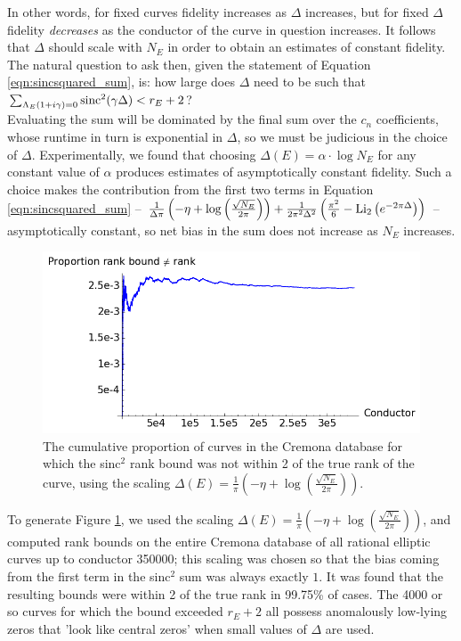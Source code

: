 In other words, for fixed curves fidelity increases as $\Delta$ increases, but for fixed $\Delta$ fidelity {\it decreases} as the conductor of the curve in question increases. It follows that $\Delta$ should scale with $N_E$ in order to obtain an estimates of constant fidelity. The natural question to ask then, given the statement of Equation \ref{eqn:sincsquared_sum}, is: how large does $\Delta$ need to be such that $\sum_{\Lambda_E(1+i\gamma)=0}\operatorname{sinc}^2(\gamma \Delta) < r_E+2$? \\

Evaluating the sum will be dominated by the final sum over the $c_n$ coefficients, whose runtime in turn is exponential in $\Delta$, so we must be judicious in the choice of $\Delta$. Experimentally, we found that choosing $\Delta(E) = \alpha \cdot \log N_E$ for any constant value of $\alpha$ produces estimates of asymptotically constant fidelity. Such a choice makes the contribution from the first two terms in Equation \ref{eqn:sincsquared_sum} -- $\frac{1}{\Delta \pi}\left(-\eta + \log\left(\frac{\sqrt{N_E}}{2\pi}\right)\right) + \frac{1}{2\pi^2 \Delta^2}\left(\frac{\pi^2}{6} - \operatorname{Li}_2\left(e^{-2\pi \Delta}\right)\right)$ -- asymptotically constant, so net bias in the sum does not increase as $N_E$ increases. \\

\begin{figure}[!h]
    \centering
    \includegraphics[width=1.0\textwidth]{graphics/rkub_ne_rk.png}
    \caption{The cumulative proportion of curves in the Cremona database for which the sinc$^2$ rank bound was not within 2 of the true rank of the curve, using the scaling $\Delta(E) = \frac{1}{\pi}\left(-\eta + \log\left(\frac{\sqrt{N_E}}{2\pi}\right)\right)$. }
    \label{fig:rkub_ne_rk}
\end{figure}

To generate Figure \ref{fig:rkub_ne_rk}, we used the scaling $\Delta(E) = \frac{1}{\pi}\left(-\eta + \log\left(\frac{\sqrt{N_E}}{2\pi}\right)\right)$, and computed rank bounds on the entire Cremona database of all rational elliptic curves up to conductor 350000; this scaling was chosen so that the bias coming from the first term in the sinc$^2$ sum was always exactly $1$. It was found that the resulting bounds were within 2 of the true rank in 99.75\% of cases. The 4000 or so curves for which the bound exceeded $r_E+2$ all possess anomalously low-lying zeros that 'look like central zeros' when small values of $\Delta$ are used. \\


